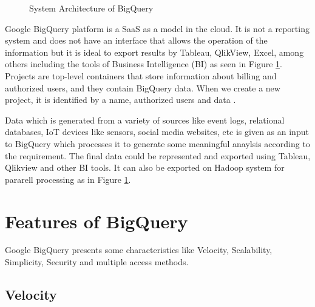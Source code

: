 \documentclass[9pt,twocolumn,twoside]{../../styles/osajnl}
\begin{document}
\begin{figure}[htbp]
\centering
{}
\caption{\cite{www-bigquery-slideshare} System Architecture of BigQuery}
\label{fig:architecture}
\end{figure}

\noindent
Google BigQuery \cite{bigquery-paper} platform is a SaaS as a model in
the cloud. It is not a reporting system and does not have an interface
that allows the operation of the information but it is ideal to export
results by Tableau, QlikView, Excel, among others including the tools
of Business Intelligence (BI) as seen in Figure
\ref{fig:architecture}. Projects are top-level containers that store
information about billing and authorized users, and they contain
BigQuery data. When we create a new project, it is identified by a
name, authorized users and data \cite{www-bigquery-documentation}.

\noindent
Data which is generated from a variety of sources like event logs,
relational databases, IoT devices like sensors, social media websites,
etc is given as an input to BigQuery which processes it to generate
some meaningful anaylsis according to the requirement. The final data
could be represented and exported using Tableau, Qlikview and other BI
tools. It can also be exported on Hadoop system for pararell
processing as in Figure \ref{fig:architecture}.

\section{Features of BigQuery}
Google BigQuery \cite{www-bigquery} presents some characteristics like Velocity,
Scalability, Simplicity, Security and multiple access methods.

\subsection{Velocity}
\end{document}
